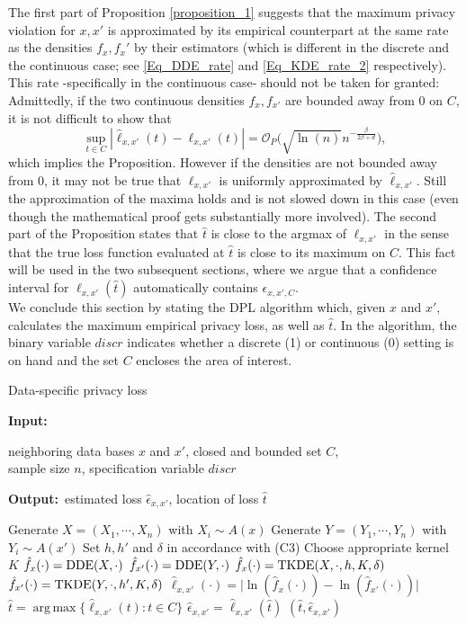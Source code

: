 \documentclass[conference]{IEEEtran}
\DeclareMathOperator*{\argmax}{arg\,max}
\renewcommand{\algorithmicrequire}{\textbf{Input:}}
\renewcommand{\algorithmicensure}{\textbf{Output:}}
\begin{document}
The first part of Proposition \ref{proposition_1} suggests that the maximum privacy violation for $x, x'$ is approximated by its empirical counterpart at the same rate as the densities $f_x, f_x'$ by their estimators (which is different in the discrete and the continuous case; see \eqref{Eq_DDE_rate} and \eqref{Eq_KDE_rate_2} respectively). This rate -specifically in the continuous case- should not be taken for granted: Admittedly, if the two continuous densities $f_x, f_{x'}$ are bounded away from $0$ on $C$, it is not difficult to show that
$$
\sup_{t \in C}|\hat \ell_{x,x'}(t)- \ell_{x,x'}(t)| = \mathcal{O}_P\Big(\sqrt{\ln(n)} n^{-\frac{\beta}{2\beta+d}}\Big),
$$
which implies the Proposition. However if the densities are not bounded away from $0$, it may not be true that $\ell_{x,x'}$ is uniformly approximated by $\hat \ell_{x,x'}$. Still the approximation of the maxima  holds and is not slowed down in this case (even though the mathematical proof gets substantially more involved).  
The second part of the Proposition states that $\hat t$ is close to the argmax of $\ell_{x,x'}$ in the sense that the true loss function evaluated at $\hat t$ is close to its maximum on $C$. This fact will be used in the two subsequent sections, where we argue that a confidence interval for $\ell_{x,x'}(\hat t)$ automatically contains $\epsilon_{x,x',C}$.\\
We conclude this section by stating the DPL algorithm which, given $x$ and $x'$, calculates the maximum empirical privacy loss, as well as $\hat{t} $. In the algorithm, the binary variable \textit{$discr$} indicates whether a discrete (1) or continuous (0) setting is on hand and the set $C$ encloses the area of interest.


\begin{algorithm}
	\caption{Data-specific privacy loss} 
	\small
	\algorithmicrequire \; \parbox[t]{\dimexpr\linewidth-\algorithmicindent}{
           neighboring data bases $x$ and $x'$, closed and bounded set $C$, \\ sample size $n$, specification variable $discr$
        } 
	\algorithmicensure \, estimated loss $\hat{\epsilon}_{x,x'}$, location of loss $\hat{t}$
	\begin{algorithmic}[1]
	\State Generate $X = (X_1, \cdots, X_n)$ with $X_i \sim A(x)$
	\State Generate $Y = (Y_1, \cdots, Y_n)$ with $Y_i \sim A(x')$
	\State Set $h,h'$ and $\delta$ in accordance with (C3)
	\State Choose appropriate kernel $K$
		    \State  $\hat f_{x} (\cdot)=\textnormal{DDE}(X,\cdot)$
	        \State $\hat f_{x'} (\cdot)=\textnormal{DDE}(Y,\cdot)$
		\Else 
		    \State $\hat{f}_{x}(\cdot) = \textnormal{TKDE}(X, \cdot,h,K,\delta)$
	        \State $\hat{f}_{x'} (\cdot) = \textnormal{TKDE}(Y, \cdot,h',K, \delta)$
		\EndIf
		\State $\hat{\ell}_{x,x'}(\cdot) = \vert \ln(\hat{f}_{x}(\cdot)) - \ln(\hat f_{x'} (\cdot)) \vert $
    	 \State $\hat{t} = \argmax \{ \hat{\ell}_{x,x'}(t): t \in C\}$ \State  $\hat{\epsilon}_{x,x'} = \hat{\ell}_{x,x'}(\hat{t})$
    	 \State \Return $(\hat{t},\hat{\epsilon}_{x,x'})$
    \EndFunction
	\end{algorithmic} 
\end{algorithm}
\end{document}
